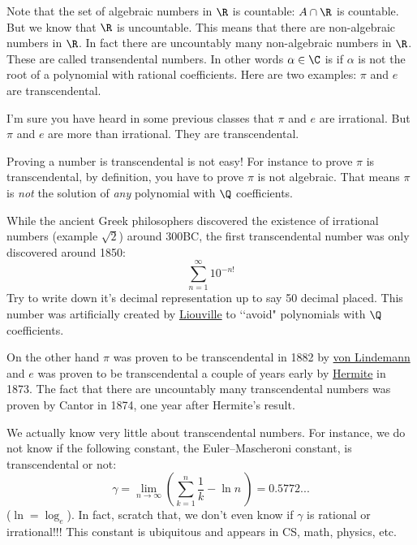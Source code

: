 Note that the set of algebraic numbers in $\R$ is countable:
$A \cap \R$ is countable.
But we know that $\R$ is uncountable.
This means that there are non-algebraic numbers in $\R$.
In fact there are uncountably many non-algebraic numbers in $\R$.
These are called transendental numbers.
In other words $\alpha \in \C$ is 
if $\alpha$ is not the root of a polynomial with rational coefficients.
Here are two examples: $\pi$ and $e$ are transcendental.

I'm sure you have heard in some previous classes that $\pi$ and $e$
are irrational.
But $\pi$ and $e$ are more than irrational.
They are transcendental.

Proving a number is transcendental is not easy!
For instance to prove $\pi$ is transcendental, by definition,
you have to prove $\pi$ is not algebraic.
That means $\pi$ is \textit{not} the solution of \textit{any} polynomial
with $\Q$ coefficients.

While the ancient Greek philosophers discovered the existence of
irrational numbers (example $\sqrt{2}$) around 300BC,
the first transcendental number was only discovered around 1850:
\[
\sum_{n = 1}^\infty 10^{-n!}
\]
Try to write down it's decimal representation up to say 50 decimal placed.
This number was artificially created by
\href{https://en.wikipedia.org/wiki/Joseph_Liouville}{Liouville}
to \lq\lq avoid"
polynomials with $\Q$ coefficients.

On the other hand $\pi$ was proven to be transcendental in
1882 by
\href{https://en.wikipedia.org/wiki/Ferdinand_von_Lindemann}{von Lindemann}
and $e$ was proven to be transcendental a couple of years early by
\href{https://en.wikipedia.org/wiki/Charles_Hermite}{Hermite} in 1873.
The fact that there are uncountably many transcendental numbers
was proven by Cantor in 1874, one year after Hermite's result.

We actually know very little about transcendental numbers.
For instance, we do not know if the following constant,
the Euler–Mascheroni constant, is
transcendental or not:
\[
\gamma = \lim_{n \rightarrow \infty}
\left(
\sum_{k = 1}^n \frac{1}{k}
-
\ln n
\
\right)
= 0.5772...
\]
($\ln = \log_e$).
In fact, scratch that, we don't even know if $\gamma$ is rational or
irrational!!!
This constant is ubiquitous and appears in CS, math, physics, etc.








